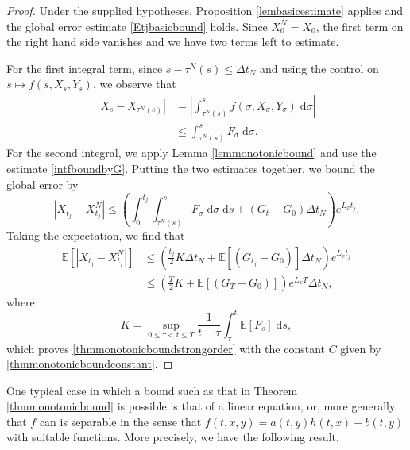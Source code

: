 \documentclass[reqno,12pt]{amsart}
\theoremstyle{plain}%
\theoremstyle{definition}
\begin{document}
\begin{proof}
  Under the supplied hypotheses, Proposition \ref{lembasicestimate} applies and the global error estimate \eqref{Etjbasicbound} holds. Since $X_0^N = X_0$, the first term on the right hand side vanishes and we have two terms left to estimate.
  
  For the first integral term, since $s - \tau^N(s) \leq \Delta t_N$ and using the control on $s \mapsto f(s, X_s, Y_s)$, we observe that
  \begin{align*}
    \left|X_s - X_{\tau^N(s)}\right| & = \left|\int_{\tau^N(s)}^s f(\sigma, X_\sigma, Y_\sigma)\;\mathrm{d}\sigma\right| \\
    & \leq \int_{\tau^N(s)}^s F_\sigma \;\mathrm{d}\sigma.
  \end{align*}
  For the second integral, we apply Lemma \ref{lemmonotonicbound} and use the estimate \eqref{intfboundbyG}. Putting the two estimates together, we bound the global error by
  \[
    |X_{t_j} - X_{t_j}^N| \leq \left( \int_0^{t_j} \int_{\tau^N(s)}^s F_\sigma \;\mathrm{d}\sigma \;\mathrm{d}s + (G_t - G_0)\Delta t_N\right) e^{L_x t_j}.
  \]
  Taking the expectation, we find that
  \begin{align*}
    \mathbb{E}\left[ |X_{t_j} - X_{t_j}^N|\right] & \leq \left( \frac{t_j}{2}K \Delta t_N + \mathbb{E}[(G_{t_j} - G_0)]\Delta t_N\right) e^{L_x t_j} \\
    & \leq \left( \frac{T}{2}K + \mathbb{E}[(G_{T} - G_0)]\right) e^{L_x T}\Delta t_N,
  \end{align*}
  where
  \[
    K = \sup_{0 \leq \tau < t \leq T}\frac{1}{t - \tau}\int_\tau^t \mathbb{E}[F_s]\;\mathrm{d}s,
  \]
  which proves \eqref{thmmonotonicboundstrongorder} with the constant $C$ given by \eqref{thmmonotonicboundconstant}.
\end{proof}

One typical case in which a bound such as that in Theorem \ref{thmmonotonicbound} is possible is that of a linear equation, or, more generally, that $f$ can is separable in the sense that $f(t, x, y) = a(t, y)h(t, x) + b(t, y)$ with suitable functions. More precisely, we have the following result.
\end{document}

